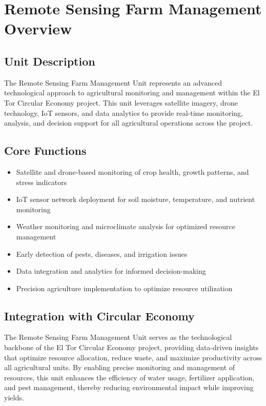 \section{Remote Sensing Farm Management Overview}

\subsection{Unit Description}
The Remote Sensing Farm Management Unit represents an advanced technological approach to agricultural monitoring and management within the El Tor Circular Economy project. This unit leverages satellite imagery, drone technology, IoT sensors, and data analytics to provide real-time monitoring, analysis, and decision support for all agricultural operations across the project.

\subsection{Core Functions}
\begin{itemize}
    \item Satellite and drone-based monitoring of crop health, growth patterns, and stress indicators
    \item IoT sensor network deployment for soil moisture, temperature, and nutrient monitoring
    \item Weather monitoring and microclimate analysis for optimized resource management
    \item Early detection of pests, diseases, and irrigation issues
    \item Data integration and analytics for informed decision-making
    \item Precision agriculture implementation to optimize resource utilization
\end{itemize}

\subsection{Integration with Circular Economy}
The Remote Sensing Farm Management Unit serves as the technological backbone of the El Tor Circular Economy project, providing data-driven insights that optimize resource allocation, reduce waste, and maximize productivity across all agricultural units. By enabling precise monitoring and management of resources, this unit enhances the efficiency of water usage, fertilizer application, and pest management, thereby reducing environmental impact while improving yields.

